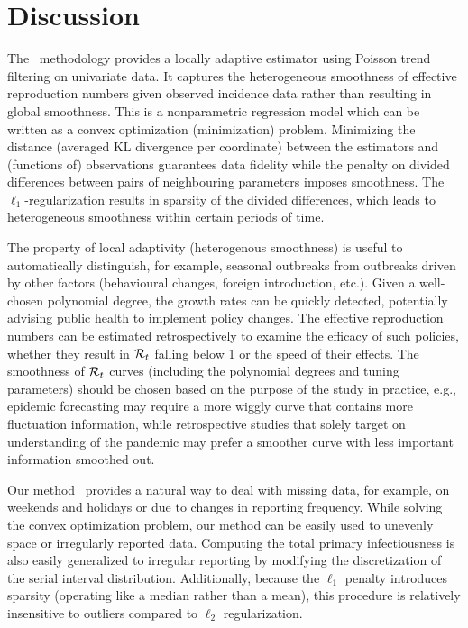 \section{Discussion}

The \RtEstim\ methodology provides a locally adaptive estimator using Poisson
trend filtering on univariate data. It captures the heterogeneous smoothness of
effective reproduction numbers given observed incidence data rather than
resulting in global smoothness. This is a nonparametric regression model which
can be written as a convex optimization (minimization) problem. Minimizing the
distance (averaged KL divergence per coordinate) between the estimators and
(functions of) observations guarantees data fidelity while the penalty on divided
differences between pairs of neighbouring parameters imposes smoothness. The
$\ell_1$-regularization results in sparsity of the divided differences, which
leads to heterogeneous smoothness within certain periods of time. 

The property of local adaptivity (heterogenous smoothness) is useful to
automatically distinguish, for example, seasonal outbreaks from outbreaks driven
by other factors (behavioural changes, foreign introduction, etc.). Given a
well-chosen polynomial degree, the growth rates can be quickly detected, 
potentially advising public health to implement policy changes. The effective
reproduction numbers can be estimated retrospectively to examine the efficacy of
such policies, whether they result in $\mathcal{R}_t$ falling below 1 or the speed of
their effects. 
%
The smoothness of $\mathcal{R}_t$ curves (including the polynomial degrees and tuning parameters) 
should be chosen based on the purpose of the study in practice, e.g., epidemic 
forecasting may require a more wiggly curve that contains more fluctuation 
information, while retrospective studies that solely target on understanding of 
the pandemic may prefer a smoother curve with less important information smoothed out. 

Our method \RtEstim\ provides a natural way to deal with missing data, for
example, on weekends and holidays or due to changes in reporting frequency.
While solving the convex optimization problem, our method can be easily 
used to unevenly space or irregularly reported data. Computing the total
primary infectiousness is also easily generalized to irregular reporting by
modifying the discretization of the serial interval distribution. Additionally,
because the $\ell_1$ penalty introduces sparsity (operating like a median
rather than a mean), this procedure is relatively insensitive to outliers
compared to $\ell_2$ regularization.


